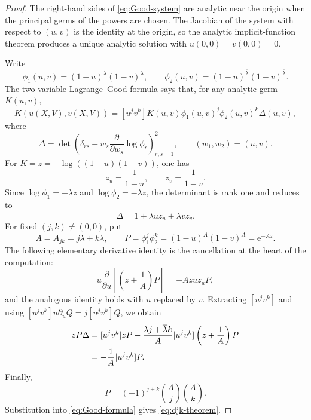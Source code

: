 \documentclass[11pt,oneside]{article}
\theoremstyle{plain}
\theoremstyle{definition}
\theoremstyle{remark}
\newcommand{\e}{\mathrm{e}}
\begin{document}
\begin{proof}
The right-hand sides of \eqref{eq:Good-system} are analytic near the origin
when the principal germs of the powers are chosen.  The Jacobian of the system
with respect to \((u,v)\) is the identity at the origin, so the analytic
implicit-function theorem produces a unique analytic solution with
\(u(0,0)=v(0,0)=0\).

Write
\begin{equation}
 \phi_1(u,v)=(1-u)^\lambda(1-v)^\lambda,
 \qquad
 \phi_2(u,v)=(1-u)^{\overline\lambda}
                         (1-v)^{\overline\lambda}.
 \label{eq:phi12}
\end{equation}
The two-variable Lagrange--Good formula says that, for any analytic germ
\(K(u,v)\),
\begin{equation}
 [X^jV^k]K(u(X,V),v(X,V))
 =[u^jv^k]K(u,v)\phi_1(u,v)^j\phi_2(u,v)^k\Delta(u,v),
 \label{eq:Good-formula}
\end{equation}
where
\begin{equation}
 \Delta=
 \det\left(\delta_{rs}-w_s\frac{\partial}{\partial w_s}
                  \log\phi_r\right)_{r,s=1}^2,
 \qquad (w_1,w_2)=(u,v).
 \label{eq:Good-determinant}
\end{equation}
For \(K=z=-\log((1-u)(1-v))\), one has
\begin{equation}
 z_u=\frac1{1-u},\qquad z_v=\frac1{1-v}.
 \label{eq:z-derivatives}
\end{equation}
Since \(\log\phi_1=-\lambda z\) and
\(\log\phi_2=-\overline\lambda z\), the determinant is rank one and reduces
to
\begin{equation}
 \Delta=1+\lambda u z_u+\overline\lambda v z_v.
 \label{eq:Delta-rank-one}
\end{equation}
For fixed \((j,k)\ne(0,0)\), put
\begin{equation}
 A=A_{jk}=j\lambda+k\overline\lambda,
 \qquad
 P=\phi_1^j\phi_2^k
 =(1-u)^A(1-v)^A=\e^{-Az}.
 \label{eq:A-P}
\end{equation}
The following elementary derivative identity is the cancellation at the heart
of the computation:
\begin{equation}
 u\frac{\partial}{\partial u}
 \left[\left(z+\frac1A\right)P\right]
 =-Azu z_uP,
 \label{eq:integration-by-parts-u}
\end{equation}
and the analogous identity holds with \(u\) replaced by \(v\).  Extracting
\([u^jv^k]\) and using
\([u^jv^k]u\partial_uQ=j[u^jv^k]Q\), we obtain
\begin{align}
 [u^jv^k]zP\Delta
 &=[u^jv^k]zP
   -\frac{\lambda j+\overline\lambda k}{A}
       [u^jv^k]\left(z+\frac1A\right)P \notag\\
 &=-\frac1A[u^jv^k]P.
 \label{eq:key-coefficient-cancellation}
\end{align}
Finally,
\begin{equation}
 [u^jv^k]P
 =(-1)^{j+k}\binom{A}{j}\binom{A}{k}.
 \label{eq:P-coefficient}
\end{equation}
Substitution into \eqref{eq:Good-formula} gives
\eqref{eq:djk-theorem}.
\end{proof}
\end{document}
